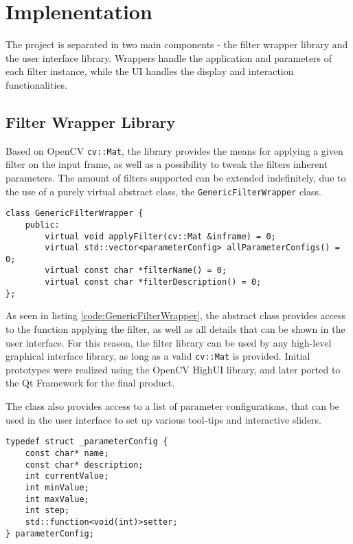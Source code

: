\section{Implenentation}

The project is separated in two main components - the filter wrapper library and the user interface library.
Wrappers handle the application and parameters of each filter instance, while the UI handles the display
and interaction functionalities.

\subsection{Filter Wrapper Library}

Based on OpenCV \verb|cv::Mat|, the library provides the means for applying a given filter on the input frame,
as well as a possibility to tweak the filters inherent parameters. The amount of filters supported can be
extended indefinitely, due to the use of a purely virtual abstract class, the \verb|GenericFilterWrapper| class.

\begin{minipage}{\textwidth}
\begin{lstlisting}[caption={Generic wrapper class definition}, label=code:GenericFilterWrapper]
class GenericFilterWrapper {
    public:
        virtual void applyFilter(cv::Mat &inframe) = 0;
        virtual std::vector<parameterConfig> allParameterConfigs() = 0;
        virtual const char *filterName() = 0;
        virtual const char *filterDescription() = 0;
};
\end{lstlisting}
\end{minipage}

As seen in listing \ref{code:GenericFilterWrapper}, the abstract class provides access to the function 
applying the filter, as well as all details that can be shown in the user interface. For this reason, 
the filter library can be used by any high-level graphical interface library, as long as a valid 
\verb|cv::Mat| is provided. Initial prototypes were realized using the OpenCV HighUI library, and later 
ported to the Qt Framework for the final product.

The class also provides access to a list of parameter configurations, that can be used in the user
interface to set up various tool-tips and interactive sliders.

\begin{minipage}{\textwidth}
\begin{lstlisting}[caption={Parameter configuration structure}, label=code:parameterConfig]
typedef struct _parameterConfig {
    const char* name;
    const char* description;
    int currentValue;
    int minValue;
    int maxValue;
    int step;
    std::function<void(int)>setter;
} parameterConfig;
\end{lstlisting}
\end{minipage}


